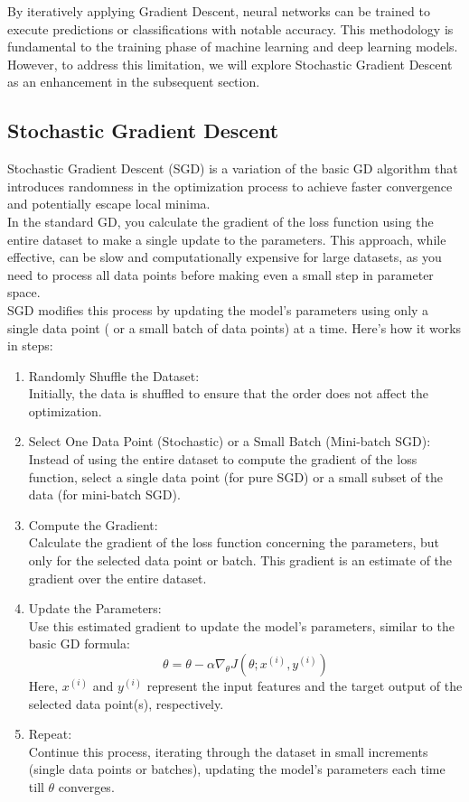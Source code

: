 \documentclass[oneside]{article}
\begin{document}
By iteratively applying Gradient Descent, neural networks can be trained to execute predictions or classifications with notable accuracy. This methodology is fundamental to the training phase of machine learning and deep learning models. However, to address this limitation, we will explore Stochastic Gradient Descent as an enhancement in the subsequent section.


\subsection{Stochastic Gradient Descent}
Stochastic Gradient Descent (SGD) is a variation of the basic GD algorithm that introduces randomness in the optimization process to achieve faster convergence and potentially escape local minima.\\
In the standard GD, you calculate the gradient of the loss function using the entire dataset to make a single update to the parameters. This approach, while effective, can be slow and computationally expensive for large datasets, as you need to process all data points before making even a small step in parameter space.\\
SGD modifies this process by updating the model's parameters using only a single data point ( or a small batch of data points) at a time. Here's how it works in steps:
\begin{enumerate}
    \item Randomly Shuffle the Dataset: \\
    Initially, the data is shuffled to ensure that the order does not affect the optimization.
    \item Select One Data Point (Stochastic) or a Small Batch (Mini-batch SGD): \\
    Instead of using the entire dataset to compute the gradient of the loss function, select a single data point (for pure SGD) or a small subset of the data (for mini-batch SGD).
    \item Compute the Gradient: \\
    Calculate the gradient of the loss function concerning the parameters, but only for the selected data point or batch. This gradient is an estimate of the gradient over the entire dataset.
    \item Update the Parameters: \\
    Use this estimated gradient to update the model's parameters, similar to the basic GD formula:
    \[ \theta = \theta - \alpha \nabla_\theta J(\theta; x^{(i)}, y^{(i)}) \]
    Here, \(x^{(i)}\) and \(y^{(i)}\) represent the input features and the target output of the selected data point(s), respectively.
    \item Repeat: \\
    Continue this process, iterating through the dataset in small increments (single data points or batches), updating the model's parameters each time till $\theta$ converges.
\end{enumerate}
\end{document}
